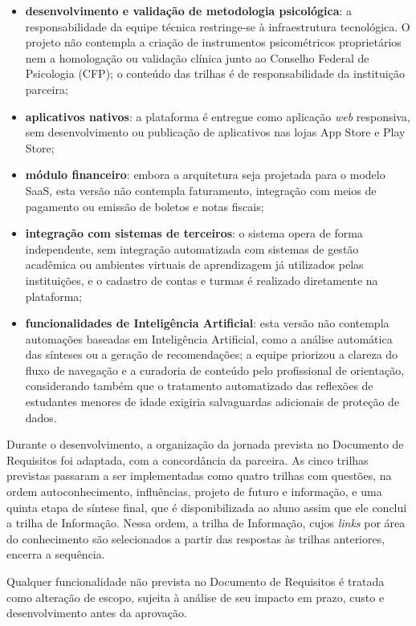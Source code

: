 \begin{itemize}
    \item \textbf{desenvolvimento e validação de metodologia psicológica}: a responsabilidade da equipe técnica restringe-se à infraestrutura tecnológica. O projeto não contempla a criação de instrumentos psicométricos proprietários nem a homologação ou validação clínica junto ao Conselho Federal de Psicologia (CFP); o conteúdo das trilhas é de responsabilidade da instituição parceira;
    \item \textbf{aplicativos nativos}: a plataforma é entregue como aplicação \textit{web} responsiva, sem desenvolvimento ou publicação de aplicativos nas lojas App Store e Play Store;
    \item \textbf{módulo financeiro}: embora a arquitetura seja projetada para o modelo SaaS, esta versão não contempla faturamento, integração com meios de pagamento ou emissão de boletos e notas fiscais;
    \item \textbf{integração com sistemas de terceiros}: o sistema opera de forma independente, sem integração automatizada com sistemas de gestão acadêmica ou ambientes virtuais de aprendizagem já utilizados pelas instituições, e o cadastro de contas e turmas é realizado diretamente na plataforma;
    \item \textbf{funcionalidades de Inteligência Artificial}: esta versão não contempla automações baseadas em Inteligência Artificial, como a análise automática das sínteses ou a geração de recomendações; a equipe priorizou a clareza do fluxo de navegação e a curadoria de conteúdo pelo profissional de orientação, considerando também que o tratamento automatizado das reflexões de estudantes menores de idade exigiria salvaguardas adicionais de proteção de dados.
\end{itemize}

Durante o desenvolvimento, a organização da jornada prevista no Documento de Requisitos foi adaptada, com a concordância da parceira. As cinco trilhas previstas passaram a ser implementadas como quatro trilhas com questões, na ordem autoconhecimento, influências, projeto de futuro e informação, e uma quinta etapa de síntese final, que é disponibilizada ao aluno assim que ele conclui a trilha de Informação. Nessa ordem, a trilha de Informação, cujos \textit{links} por área do conhecimento são selecionados a partir das respostas às trilhas anteriores, encerra a sequência.

Qualquer funcionalidade não prevista no Documento de Requisitos é tratada como alteração de escopo, sujeita à análise de seu impacto em prazo, custo e desenvolvimento antes da aprovação.

